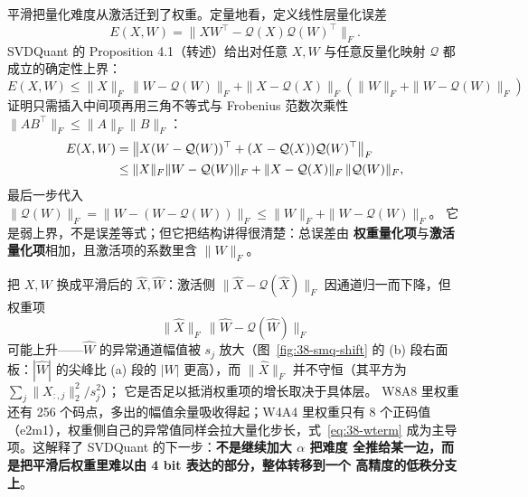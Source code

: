 平滑把量化难度从激活迁到了权重。定量地看，定义线性层量化误差
\begin{equation}
  E(X,W)=\bigl\|XW^{\top}-\mathcal Q(X)\mathcal Q(W)^{\top}\bigr\|_F.
  \label{eq:38-exw}
\end{equation}
SVDQuant 的 Proposition 4.1（转述）给出对任意 $X,W$ 与任意反量化映射 $\mathcal Q$
都成立的确定性上界：
\begin{equation}
  \boxed{
  E(X,W)\le
  \|X\|_F\,\|W-\mathcal Q(W)\|_F
  +\|X-\mathcal Q(X)\|_F
   \left(\|W\|_F+\|W-\mathcal Q(W)\|_F\right)}
  \label{eq:38-prop41}
\end{equation}
证明只需插入中间项再用三角不等式与 Frobenius 范数次乘性
$\|AB^{\top}\|_F\le\|A\|_F\|B\|_F$：
\begin{align}
  E(X,W)
  &=\bigl\|X(W-\mathcal Q(W))^{\top}+(X-\mathcal Q(X))\mathcal Q(W)^{\top}\bigr\|_F \notag\\
  &\le\|X\|_F\|W-\mathcal Q(W)\|_F+\|X-\mathcal Q(X)\|_F\,\|\mathcal Q(W)\|_F,
  \label{eq:38-prop41-pf}
\end{align}
最后一步代入
$\|\mathcal Q(W)\|_F=\|W-(W-\mathcal Q(W))\|_F\le\|W\|_F+\|W-\mathcal Q(W)\|_F$。
它是弱上界，不是误差等式；但它把结构讲得很清楚：总误差由
\textbf{权重量化项}与\textbf{激活量化项}相加，且激活项的系数里含
$\|W\|_F$。

把 $X,W$ 换成平滑后的 $\widehat X,\widehat W$：激活侧
$\|\widehat X-\mathcal Q(\widehat X)\|_F$ 因通道归一而下降，但权重项
\begin{equation}
  \|\widehat X\|_F\,\|\widehat W-\mathcal Q(\widehat W)\|_F
  \label{eq:38-wterm}
\end{equation}
可能上升——$\widehat W$ 的异常通道幅值被 $s_j$ 放大（图~\ref{fig:38-smq-shift}
的 (b) 段右面板：$|\widehat W|$ 的尖峰比 (a) 段的 $|W|$ 更高），而
$\|\widehat X\|_F$ 并不守恒（其平方为 $\sum_j\|X_{:,j}\|_2^2/s_j^2$）；
它是否足以抵消权重项的增长取决于具体层。
W8A8 里权重还有 256 个码点，多出的幅值余量吸收得起；W4A4 里权重只有
8 个正码值（e2m1），权重侧自己的异常值同样会拉大量化步长，式~\ref{eq:38-wterm}
成为主导项。这解释了 SVDQuant 的下一步：\textbf{不是继续加大 $\alpha$ 把难度
全推给某一边，而是把平滑后权重里难以由 4 bit 表达的部分，整体转移到一个
高精度的低秩分支上}。

